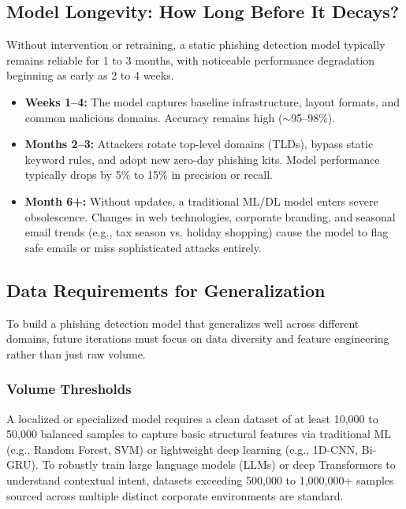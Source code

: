 \documentclass[conference]{IEEEtran}
\begin{document}
\subsection{Model Longevity: How Long Before It Decays?}
Without intervention or retraining, a static phishing detection model typically remains reliable for 1 to 3 months, with noticeable performance degradation beginning as early as 2 to 4 weeks.
\begin{itemize}
    \item \textbf{Weeks 1--4:} The model captures baseline infrastructure, layout formats, and common malicious domains. Accuracy remains high ($\sim$95--98\%).
    \item \textbf{Months 2--3:} Attackers rotate top-level domains (TLDs), bypass static keyword rules, and adopt new zero-day phishing kits. Model performance typically drops by 5\% to 15\% in precision or recall.
    \item \textbf{Month 6+:} Without updates, a traditional ML/DL model enters severe obsolescence. Changes in web technologies, corporate branding, and seasonal email trends (e.g., tax season vs. holiday shopping) cause the model to flag safe emails or miss sophisticated attacks entirely.
\end{itemize}

\subsection{Data Requirements for Generalization}
To build a phishing detection model that generalizes well across different domains, future iterations must focus on data diversity and feature engineering rather than just raw volume.

\subsubsection{Volume Thresholds}
A localized or specialized model requires a clean dataset of at least 10,000 to 50,000 balanced samples to capture basic structural features via traditional ML (e.g., Random Forest, SVM) or lightweight deep learning (e.g., 1D-CNN, Bi-GRU). To robustly train large language models (LLMs) or deep Transformers to understand contextual intent, datasets exceeding 500,000 to 1,000,000+ samples sourced across multiple distinct corporate environments are standard.
\end{document}
